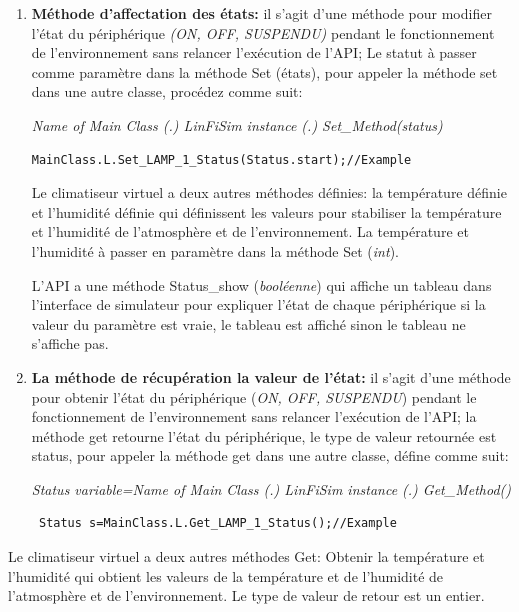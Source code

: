 \begin{enumerate}
   
\item \textbf{Méthode d'affectation des états:} il s'agit d'une méthode pour modifier l'état du périphérique \textit{(ON, OFF, SUSPENDU)} pendant le fonctionnement de l'environnement sans relancer l'exécution de l'API;
Le statut à passer comme paramètre dans la méthode Set (états), pour appeler la méthode set dans une autre classe, procédez comme suit:


\begin{center}
\textit{Name of Main Class (.) LinFiSim instance (.) Set\_Method(status)}
\end{center}
\begin{lstlisting}
MainClass.L.Set_LAMP_1_Status(Status.start);//Example
\end{lstlisting}
Le climatiseur virtuel a deux autres méthodes définies: la température définie et l'humidité définie qui définissent les valeurs pour stabiliser la température et l'humidité de l'atmosphère et de l'environnement. La température et l'humidité à passer en paramètre dans la méthode Set (\textit{int}).


L'API a une méthode Status\_show (\textit{booléenne}) qui affiche un tableau dans l'interface de simulateur pour expliquer l'état de chaque périphérique si la valeur du paramètre est vraie, le tableau est affiché sinon le tableau ne s'affiche pas.


\item \textbf{La méthode de récupération la valeur de l'état:} il s'agit d'une méthode pour obtenir l'état du périphérique (\textit{ON, OFF, SUSPENDU}) pendant le fonctionnement de l'environnement sans relancer l'exécution de l'API; la méthode get retourne l'état du périphérique, le type de valeur retournée est status, pour appeler la méthode get dans une autre classe, défine comme suit:


\textit{Status variable=Name of Main Class (.) LinFiSim instance (.) Get\_Method()}
\begin{lstlisting}
 Status s=MainClass.L.Get_LAMP_1_Status();//Example
\end{lstlisting}
\end{enumerate}
Le climatiseur virtuel  a deux autres méthodes Get: Obtenir la température et l'humidité qui obtient les valeurs de la température et de l'humidité de l'atmosphère et de l'environnement. Le type de valeur de retour est un entier.

